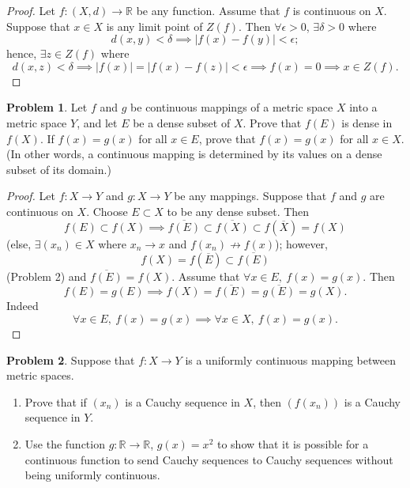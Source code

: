 \documentclass{amsart}
\theoremstyle{definition}
\newtheorem{problem}{Problem}
\begin{document}
\begin{proof}
    Let $f: (X,d) \to \mathbb{R}$ be any function. Assume that $f$ is continuous on $X$. Suppose that $x \in X$ is any limit point of $Z(f)$. Then $\forall \epsilon > 0$, $\exists \delta > 0$ where
    \[
    d(x,y) < \delta \implies \vert f(x) - f(y) \vert < \epsilon;
    \]
    hence, $\exists z \in Z(f)$ where 
    \[
    d(x,z) < \delta \implies \vert f(x) \vert = \vert f(x) - f(z) \vert < \epsilon \implies f(x) = 0 \implies x \in Z(f).
    \]
\end{proof}

\begin{problem}
    Let $f$ and $g$ be continuous mappings of a metric space $X$ into a metric space $Y$, and let $E$ be a dense subset of $X$. Prove that $f(E)$ is dense in $f(X)$. If $f(x) = g(x)$ for all $x \in E$, prove that $f(x) = g(x)$ for all $x \in X$. (In other words, a continuous mapping is determined by its values on a dense subset of its domain.)
\end{problem}

\begin{proof}
    Let $f: X \to Y$ and $g: X \to Y$ be any mappings. Suppose that $f$ and $g$ are continuous on $X$. Choose $E \subset X$ to be any dense subset. Then 
    \[
    f(E) \subset f(X) \implies \overline{f(E)} \subset \overline{f(X)} \subset f(\overline{X}) = f(X)
    \]
    (else, $\exists (x_n) \in X$ where $x_n \to x$ and $f(x_n) \not \to f(x)$); however, 
    \[
    f(X) = f(\overline{E}) \subset \overline{f(E)}
    \]
    (Problem 2) and $\overline{f(E)} = f(X)$. Assume that $\forall x \in E, \ f(x) = g(x)$. Then 
    \[
    f(E) = g(E) \implies f(X) = \overline{f(E)} = \overline{g(E)} = g(X).
    \]
    Indeed
    \[
    \forall x \in E, \ f(x) = g(x) \implies \forall x \in X, \ f(x) = g(x).
    \]
\end{proof}

\begin{problem}
    Suppose that $f: X \to Y$ is a uniformly continuous mapping between metric spaces.
    \begin{enumerate}[label = (\alph*)]
        \item Prove that if $(x_n)$ is a Cauchy sequence in $X$, then $(f(x_n))$ is a Cauchy sequence in $Y$.
        \item Use the function $g : \mathbb{R} \to \mathbb{R}$, $g(x) = x^2$ to show that it is possible for a continuous function to send Cauchy sequences to Cauchy sequences without being uniformly continuous.
\end{enumerate}
\end{problem}
\end{document}
